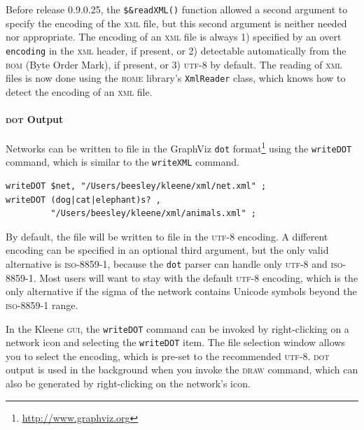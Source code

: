 \documentclass[letterpaper,12pt]{article}
\newcommand{\acro}{\textsc}
\begin{document}
\begin{samepage}
\begin{changebar}

Before release 0.9.0.25, the \verb!$&readXML()! function allowed a second
argument to specify the encoding of the \acro{xml} file, but this second
argument is neither needed nor appropriate. The encoding of an
\acro{xml} file is always 1) specified by an overt \texttt{encoding} in
the \acro{xml} header, if present, or 2) detectable automatically from the
\acro{bom} (Byte Order Mark), if present, or 3) \acro{utf-8} by default.
The reading of \acro{xml} files is now done using the \acro{rome} library's
\texttt{XmlReader} class, which knows how to detect the encoding of an
\acro{xml} file.

\end{changebar}
\end{samepage}

\paragraph{\acro{dot} Output}

Networks can be written to file in the GraphViz \verb!dot!
format\footnote{\url{http://www.graphviz.org}} using the
\texttt{writeDOT} command, which is similar to the \texttt{writeXML} command.

\begin{samepage}
\begin{changebar}

\begin{Verbatim}[fontsize=\small]
writeDOT $net, "/Users/beesley/kleene/xml/net.xml" ;
writeDOT (dog|cat|elephant)s? , 
         "/Users/beesley/kleene/xml/animals.xml" ;
\end{Verbatim}

\end{changebar}
\end{samepage}

\begin{samepage}
\begin{changebar}

By default, the file will be written to file in the \acro{utf-8}
encoding.  A different encoding can be specified in an optional third
argument, but the only valid alternative is \acro{iso-8859-1}, because
the \verb!dot! parser can handle only \acro{utf-8} and \acro{iso-8859-1}.
Most users will want to stay with the default \acro{utf-8} encoding,
which is the only alternative if the sigma of the network contains
Unicode symbols beyond the \acro{iso-8859-1} range.

In the Kleene \acro{gui}, the \verb!writeDOT! command can be invoked by
right-clicking on a network icon and selecting the \verb!writeDOT! item.
The file selection window allows you to select the encoding, which is
pre-set to the recommended \acro{utf-8}.  \acro{dot} output is used in the
background when you invoke the \acro{draw} command, which can also be
generated by right-clicking on the network's icon.

\end{changebar}
\end{samepage}
\end{document}
